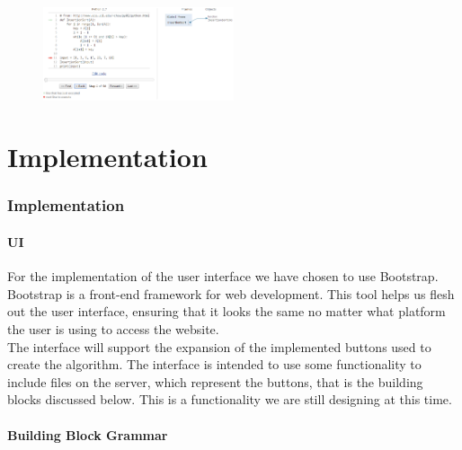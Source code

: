 \documentclass[11pt]{article}
\begin{document}
\begin{figure}[h]
    \centering
    \includegraphics[width=0.5\textwidth]{pytutins1}
    \caption{}
    \label{fig:dinning}
\end{figure}

\part{Implementation}
\section{Implementation}
\subsection{UI}
For the implementation of the user interface we have chosen to use Bootstrap. Bootstrap is a front-end framework for web development. This tool helps us flesh out the user interface, ensuring that it looks the same no matter what platform the user is using to access the website.\\
The interface will support the expansion of the implemented buttons used to create the algorithm. The interface is intended to use some functionality to include files on the server, which represent the buttons, that is the building blocks discussed below. This is a functionality we are still designing at this time.

\subsection{Building Block Grammar}
\end{document}
